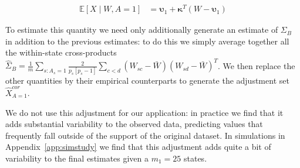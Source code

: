 \begin{align}\label{eqn:xcoradjust}
    \mathbb{E}[X \mid W, A = 1] &=  \boldsymbol{\upsilon}_1 + \boldsymbol{\kappa}^T(W - \boldsymbol{\upsilon}_1)  
\end{align}

To estimate this quantity we need only additionally generate an estimate of $\Sigma_B$ in addition to the previous estimates: to do this we simply average together all the within-state cross-products $\hat{\Sigma}_{B} = \frac{1}{m}\sum_{s: A_s = 1}\frac{2}{p_s[p_s - 1]}\sum_{c < d}(W_{sc} - \bar{W})(W_{sd} - \bar{W})^T$. We then replace the other quantities by their empirical counterparts to generate the adjustment set $\hat{X}_{A=1}^{cor}$.

We do not use this adjustment for our application: in practice we find that it adds substantial variability to the observed data, predicting values that frequently fall outside of the support of the original dataset. In simulations in Appendix~\ref{app:simstudy} we find that this adjustment adds quite a bit of variability to the final estimates given a $m_1 = 25$ states. 